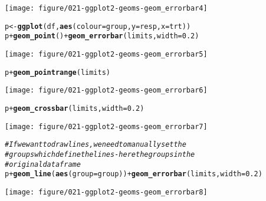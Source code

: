 \documentclass[a4paper,titlepage]{tufte-handout}\usepackage[]{graphicx}\usepackage[]{color}
\makeatletter
\def\maxwidth{ %
  \ifdim\Gin@nat@width>\linewidth
    \linewidth
  \else
    \Gin@nat@width
  \fi
}
\newcommand{\hlnum}[1]{\textcolor[rgb]{0.686,0.059,0.569}{#1}}%
\newcommand{\hlcom}[1]{\textcolor[rgb]{0.678,0.584,0.686}{\textit{#1}}}%
\newcommand{\hlopt}[1]{\textcolor[rgb]{0,0,0}{#1}}%
\newcommand{\hlstd}[1]{\textcolor[rgb]{0.345,0.345,0.345}{#1}}%
\newcommand{\hlkwb}[1]{\textcolor[rgb]{0.69,0.353,0.396}{#1}}%
\newcommand{\hlkwc}[1]{\textcolor[rgb]{0.333,0.667,0.333}{#1}}%
\newcommand{\hlkwd}[1]{\textcolor[rgb]{0.737,0.353,0.396}{\textbf{#1}}}%
\newenvironment{kframe}{%
 \def\at@end@of@kframe{}%
 \ifinner\ifhmode%
  \def\at@end@of@kframe{\end{minipage}}%
  \begin{minipage}{\columnwidth}%
 \fi\fi%
 \def\FrameCommand##1{\hskip\@totalleftmargin \hskip-\fboxsep
 \colorbox{shadecolor}{##1}\hskip-\fboxsep
     \hskip-\linewidth \hskip-\@totalleftmargin \hskip\columnwidth}%
 \MakeFramed {\advance\hsize-\width
   \@totalleftmargin\z@ \linewidth\hsize
   \@setminipage}}%
 {\par\unskip\endMakeFramed%
 \at@end@of@kframe}
\newenvironment{knitrout}{}{} %
\makeatother
\begin{document}
\begin{knitrout}
\begin{kframe}
{\ttfamily\noindent\itshape{}}\end{kframe}
\texttt{[image: figure/021-ggplot2-geoms-geom\_errorbar4]} 
\begin{kframe}\begin{alltt}
\hlstd{p} \hlkwb{<-} \hlkwd{ggplot}\hlstd{(df,} \hlkwd{aes}\hlstd{(}\hlkwc{colour}\hlstd{=group,} \hlkwc{y}\hlstd{=resp,} \hlkwc{x}\hlstd{=trt))}
\hlstd{p} \hlopt{+} \hlkwd{geom_point}\hlstd{()} \hlopt{+} \hlkwd{geom_errorbar}\hlstd{(limits,} \hlkwc{width}\hlstd{=}\hlnum{0.2}\hlstd{)}
\end{alltt}
\end{kframe}
\texttt{[image: figure/021-ggplot2-geoms-geom\_errorbar5]} 
\begin{kframe}\begin{alltt}
\hlstd{p} \hlopt{+} \hlkwd{geom_pointrange}\hlstd{(limits)}
\end{alltt}
\end{kframe}
\texttt{[image: figure/021-ggplot2-geoms-geom\_errorbar6]} 
\begin{kframe}\begin{alltt}
\hlstd{p} \hlopt{+} \hlkwd{geom_crossbar}\hlstd{(limits,} \hlkwc{width}\hlstd{=}\hlnum{0.2}\hlstd{)}
\end{alltt}
\end{kframe}
\texttt{[image: figure/021-ggplot2-geoms-geom\_errorbar7]} 
\begin{kframe}\begin{alltt}
\hlcom{# If we want to draw lines, we need to manually set the}
\hlcom{# groups which define the lines - here the groups in the}
\hlcom{# original dataframe}
\hlstd{p} \hlopt{+} \hlkwd{geom_line}\hlstd{(}\hlkwd{aes}\hlstd{(}\hlkwc{group}\hlstd{=group))} \hlopt{+} \hlkwd{geom_errorbar}\hlstd{(limits,} \hlkwc{width}\hlstd{=}\hlnum{0.2}\hlstd{)}
\end{alltt}
\end{kframe}
\texttt{[image: figure/021-ggplot2-geoms-geom\_errorbar8]} 

\end{knitrout}
\end{document}
